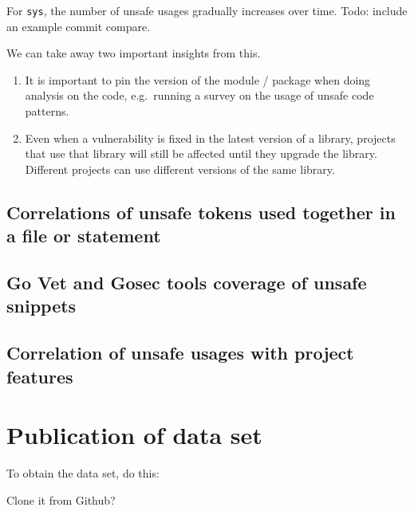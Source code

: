 For \texttt{sys}, the number of unsafe usages gradually increases over time.
Todo: include an example commit compare.

We can take away two important insights from this.

\begin{enumerate}
    \item It is important to pin the version of the module / package when doing analysis on the code, e.g.\ running a
    survey on the usage of unsafe code patterns.
    \item Even when a vulnerability is fixed in the latest version of a library, projects that use that library will
    still be affected until they upgrade the library.
    Different projects can use different versions of the same library.
\end{enumerate}


\subsection{Correlations of unsafe tokens used together in a file or statement}\label{subsec:results-correlation-together}



\subsection{Go Vet and Gosec tools coverage of unsafe snippets}\label{subsec:results-vet-gosec}



\subsection{Correlation of unsafe usages with project features}\label{subsec:results-correlation-project}



\section{Publication of data set}\label{sec:survey-publication}

To obtain the data set, do this:

Clone it from Github?
